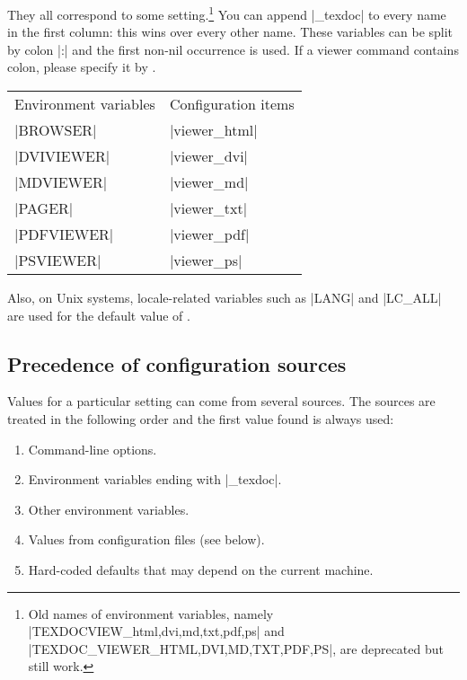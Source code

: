 \documentclass[draft]{texdoc-doc}
\begin{document}
They all correspond to some  setting.\footnote{Old names
of environment variables, namely |TEXDOCVIEW_{html,dvi,md,txt,pdf,ps}| and
|TEXDOC_VIEWER_{HTML,DVI,MD,TXT,PDF,PS}|, are deprecated but still work.} You
can append |_texdoc| to every name in the first column: this wins over every
other name. These variables can be split by colon |:| and the first non-nil
occurrence is used. If a viewer command contains colon, please specify it by
.
%
\begin{center}
\begin{tabular}{ll}
Environment variables & Configuration items \\
|BROWSER|             & |viewer_html|       \\
|DVIVIEWER|           & |viewer_dvi|        \\
|MDVIEWER|            & |viewer_md|         \\
|PAGER|               & |viewer_txt|        \\
|PDFVIEWER|           & |viewer_pdf|        \\
|PSVIEWER|            & |viewer_ps|         \\
\end{tabular}
\end{center}
%
Also, on Unix systems, locale-related variables such as |LANG| and |LC_ALL|
are used for the default value of .

\subsection{Precedence of configuration sources}
\label{sec:prec}

Values for a particular setting can come from several sources. The sources are
treated in the following order and the first value found is always used:
%
\begin{enumerate}
\item Command-line options.
\item Environment variables ending with |_texdoc|.
\item Other environment variables.
\item Values from configuration files (see below).
\item Hard-coded defaults that may depend on the current machine.
\end{enumerate}
\end{document}
